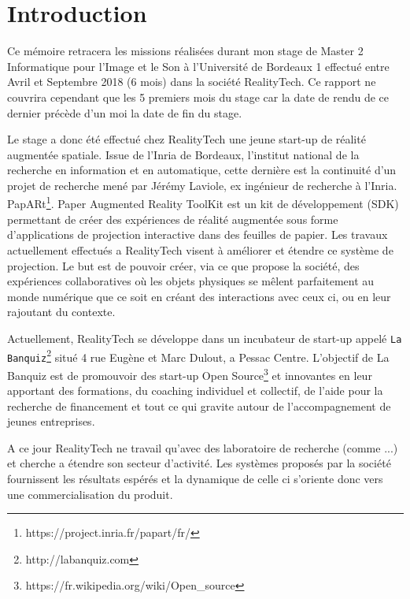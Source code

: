 \chapter{Introduction}

Ce mémoire retracera les missions réalisées durant mon stage de Master 2 Informatique pour l'Image et le Son à l'Université de Bordeaux 1 effectué entre Avril et Septembre 2018 (6 mois) dans la société RealityTech. Ce rapport ne couvrira cependant que les 5 premiers mois du stage car la date de rendu de ce dernier précède d'un moi la date de fin du stage.

Le stage a donc été effectué chez RealityTech une jeune start-up de réalité augmentée spatiale. Issue de l'Inria de Bordeaux, l'institut national de la recherche en information et en automatique, cette dernière est la continuité d'un projet de recherche mené par Jérémy Laviole, ex ingénieur de recherche à l'Inria. PapARt\footnote{https://project.inria.fr/papart/fr/}. Paper Augmented Reality ToolKit est un kit de développement (SDK) permettant de créer des expériences de réalité augmentée sous forme d'applications de projection interactive dans des feuilles de papier. Les travaux actuellement effectués a RealityTech visent à améliorer et étendre ce système de projection. Le but est de pouvoir créer, via ce que propose la société, des expériences collaboratives où les objets physiques se mêlent parfaitement au monde numérique que ce soit en créant des interactions avec ceux ci, ou en leur rajoutant du contexte.

Actuellement, RealityTech se développe dans un incubateur de start-up appelé \texttt{La Banquiz}\footnote{http://labanquiz.com} situé 4 rue Eugène et Marc Dulout, a Pessac Centre. L'objectif de La Banquiz est de promouvoir des start-up Open Source\footnote{https://fr.wikipedia.org/wiki/Open\_source} et innovantes en leur apportant des formations, du coaching individuel et collectif, de l'aide pour la recherche de financement et tout ce qui gravite autour de l'accompagnement de jeunes entreprises.

A ce jour RealityTech ne travail qu'avec des laboratoire de recherche (comme ...) et cherche a étendre son secteur d'activité. Les systèmes proposés par la société fournissent les résultats espérés et la dynamique de celle ci s'oriente donc vers une commercialisation du produit. %

